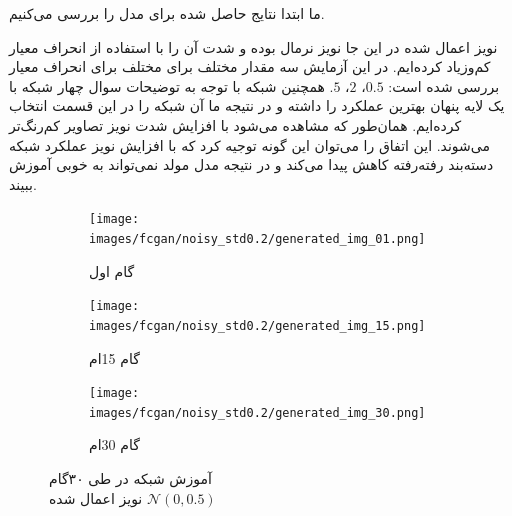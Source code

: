 \documentclass[12pt, a4paper]{book}
\begin{document}
ما ابتدا نتایج حاصل شده برای مدل  را بررسی می‌کنیم.

نویز اعمال شده در این جا نویز نرمال بوده و شدت آن‌ را با استفاده از انحراف معیار کم‌‌وزیاد کرده‌ایم.
در این آزمایش سه مقدار مختلف برای مختلف برای انحراف معیار بررسی شده است: $0.5$، $2$، $5$.
همچنین شبکه با توجه به توضیحات سوال چهار شبکه با یک لایه پنهان بهترین عملکرد را داشته و در نتیجه ما
آن شبکه را در این قسمت انتخاب کرده‌ایم. همان‌طور که مشاهده می‌شود با افزایش شدت نویز تصاویر کم‌رنگ‌تر می‌شوند.
این اتفاق را می‌توان این گونه توجیه کرد که با افزایش نویز عملکرد شبکه دسته‌بند رفته‌رفته کاهش پیدا می‌کند
و در نتیجه مدل مولد نمی‌تواند به خوبی آموزش ببیند.

\begin{figure}[h]
    \begin{subfigure}{0.3\linewidth}
        \texttt{[image: images/fcgan/noisy\_std0.2/generated\_img\_01.png]}
        \caption{گام اول}
    \end{subfigure}
    \begin{subfigure}{0.3\linewidth}
        \texttt{[image: images/fcgan/noisy\_std0.2/generated\_img\_15.png]}
        \caption{گام 15ام}
    \end{subfigure}
    \begin{subfigure}{0.3\linewidth}
        \texttt{[image: images/fcgan/noisy\_std0.2/generated\_img\_30.png]}
        \caption{گام 30ام}
    \end{subfigure}
    \caption{آموزش شبکه  در طی ۳۰گام\\ نویز اعمال شده $\mathcal{N}(0,0.5)$}
    \label{fcgan_noisy_std0.2}
\end{figure}
\end{document}
